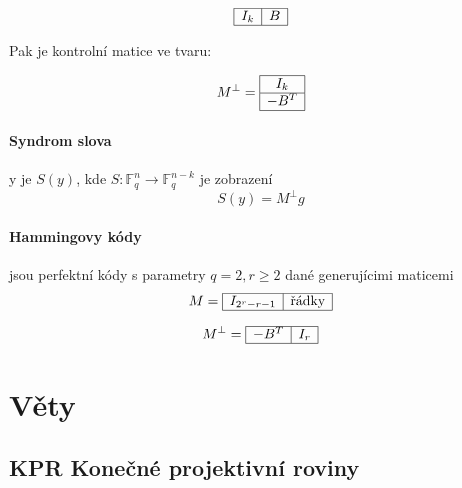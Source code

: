 \documentclass[10pt,a4paper]{article}
\theoremstyle{plain}
\begin{document}
\[
\begin{array}{|c|c|}
\hline
I_k & B \\
\hline
\end{array}
\]

Pak je kontrolní matice ve tvaru:

\[ M^\perp =
\begin{array}{|c|}
\hline
I_k \\
\hline
-B^T \\
\hline
\end{array}
\]

\paragraph{Syndrom slova} y je $S(y)$, kde $S: \mathbb{F}_q^{n} \to \mathbb{F}_q^{n-k}$ je zobrazení \[ S(y) = M^\perp g\]

\paragraph{Hammingovy kódy} jsou perfektní kódy s parametry $q=2, r \geq 2$ dané generujícimi maticemi
\[ M = \begin{array}{|c|c|}
\hline
I_{2^r-r-1} & \text{řádky}\\
\hline
\end{array}\]

\[ M^\perp = \begin{array}{|c|c|}
\hline
-B^T & I_r \\
\hline
\end{array}\]


\section{Věty}



\subsection{KPR Konečné projektivní roviny}
\end{document}
